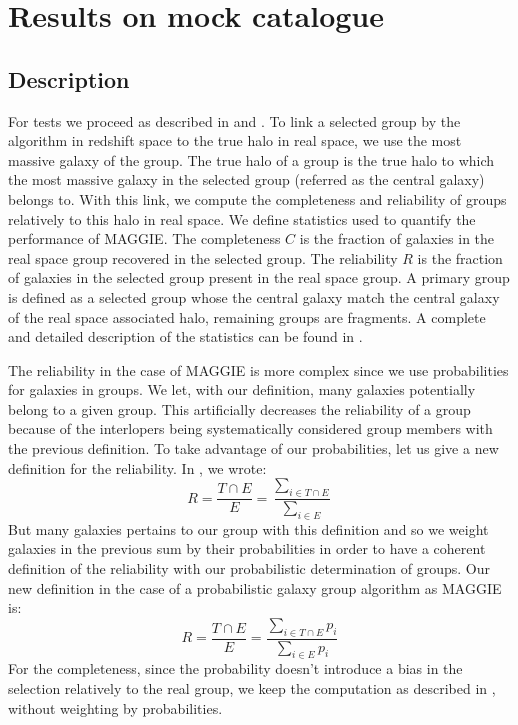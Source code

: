 \section{Results on mock catalogue}
\label{sec:results_on_mock_catalogue}

\subsection{Description}
\label{sub:maggie_tests_description}

For tests we proceed as described in \citet{Yang+07} and \citet{DM+14a}. To
link a selected group by the algorithm in redshift space to the true halo in
real space, we use the most massive galaxy of the group. The true halo of a
group is the true halo to which the most massive galaxy in the selected group
(referred as the central galaxy) belongs to. With this link, we compute the
completeness and reliability of groups relatively to this halo in real space.
We define statistics used to quantify the performance of MAGGIE\@. The
completeness $C$ is the fraction of galaxies in the real space group recovered
in the selected group. The reliability $R$ is the fraction of galaxies in the
selected group present in the real space group. A primary group is defined as a
selected group whose the central galaxy match the central galaxy of the real
space associated halo, remaining groups are fragments. A complete and detailed
description of the statistics can be found in \citet{DM+14a}.

The reliability in the case of MAGGIE is more complex since we use
probabilities for galaxies in groups. We let, with our definition, many
galaxies potentially belong to a given group. This artificially decreases
the reliability of a group because of the interlopers being systematically
considered group members with the previous definition. To take advantage of
our probabilities, let us give a new definition for the reliability. In
\citet{DM+14a}, we wrote:
%
\begin{equation}
    R=\frac{T \cap E}{E}=\frac{\sum_{i\in T\cap E}}{\sum_{i\in E}}
\end{equation}
%
But many galaxies pertains to our group with this definition and so we
weight galaxies in the previous sum by their probabilities in order to have
a coherent definition of the reliability with our probabilistic
determination of groups. Our new definition in the case of a probabilistic
galaxy group algorithm as MAGGIE is:
%
\begin{equation}
    R=\frac{T \cap E}{E}=\frac{\sum_{i\in T\cap E} p_i}{\sum_{i\in E}p_i}
\end{equation}
%
For the completeness, since the probability doesn't introduce a bias in the
selection relatively to the real group, we keep the computation as described
in \citet{DM+14a}, without weighting by probabilities.

